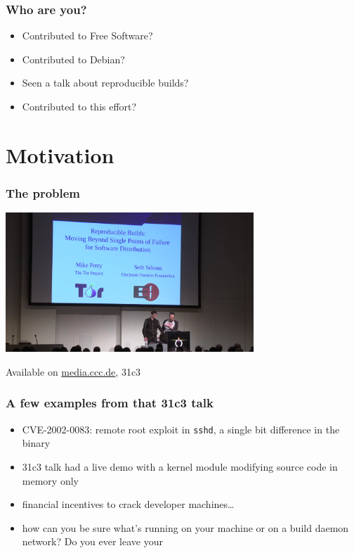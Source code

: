 \documentclass[14pt,aspectratio=169]{beamer}
\begin{document}
\begin{frame}
 \frametitle{Who are you?}
 \begin{itemize}
  \item Contributed to Free Software?
  \item<2-4> Contributed to Debian?
  \item<2-4> Seen a talk about reproducible builds?
  \item<4> Contributed to this effort?
 \end{itemize}
\end{frame}

\section{Motivation}

\begin{frame}
 \frametitle{The problem}

 \begin{center}
  \includegraphics[width=0.7\textwidth]{images/31c3.png}

  Available on \url{media.ccc.de}, 31c3
 \end{center}
\end{frame}

\begin{frame}[fragile]
 \frametitle{A few examples from that 31c3 talk}
 \begin{itemize}
  \item CVE-2002-0083: remote root exploit in \texttt{sshd}, a single bit difference in the binary
  \item<2-5> 31c3 talk had a live demo with a kernel module modifying source code in memory only
  \item<3-5> financial incentives to crack developer machines…
  \item<4-5> {how can you be sure what's running on your machine or on a build
  daemon network? Do you ever leave your} 
 \end{itemize}
\end{frame}
\end{document}

